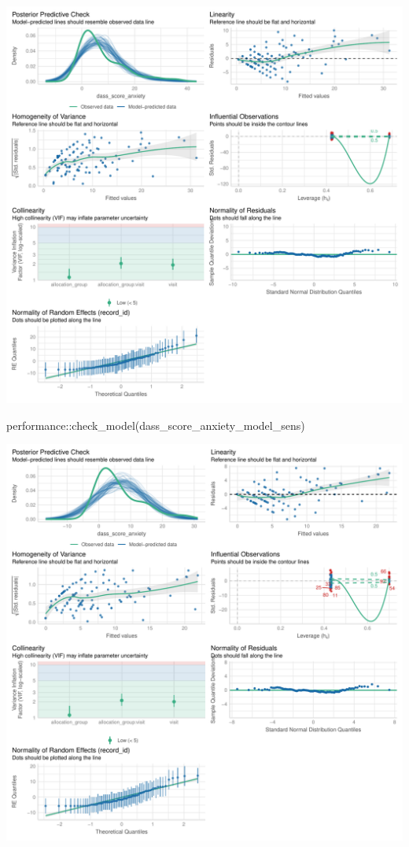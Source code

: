 \documentclass[
  letterpaper,
  DIV=11,
  numbers=noendperiod]{scrartcl}
\newenvironment{Shaded}{\begin{snugshade}}{\end{snugshade}}
\newcommand{\FunctionTok}[1]{\textcolor[rgb]{0.28,0.35,0.67}{#1}}
\newcommand{\NormalTok}[1]{\textcolor[rgb]{0.00,0.23,0.31}{#1}}
\newcommand{\SpecialCharTok}[1]{\textcolor[rgb]{0.37,0.37,0.37}{#1}}
\begin{document}
\includegraphics{Outcomes_V1V2V3_files/figure-pdf/dass_score_anxiety_4-1.pdf}

\begin{Shaded}
\begin{Highlighting}[]
\NormalTok{performance}\SpecialCharTok{::}\FunctionTok{check\_model}\NormalTok{(dass\_score\_anxiety\_model\_sens)}
\end{Highlighting}
\end{Shaded}

\includegraphics{Outcomes_V1V2V3_files/figure-pdf/dass_score_anxiety_4-2.pdf}
\end{document}
